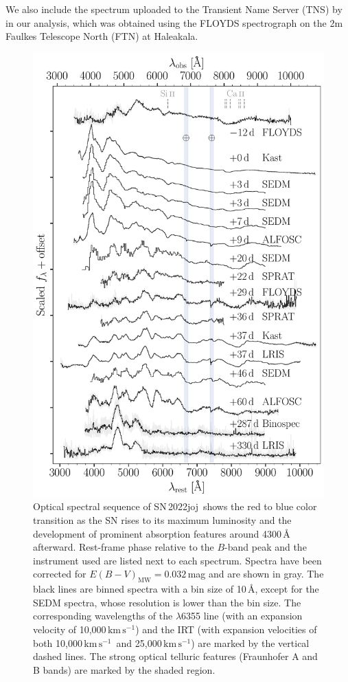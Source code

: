 \documentclass[twocolumn]{aastex631}
\newcommand{\sn}{SN\,2022joj}
\newcommand{\kms}{$\mathrm{km}\,\mathrm{s}^{-1}$}
\begin{document}
\begin{CJK*}{UTF8}{gbsn}
We also include the spectrum uploaded to the Transient Name Server (TNS) by \citet{Newsome_2022TNSCR} in our analysis, which was obtained using the FLOYDS spectrograph on the 2m Faulkes Telescope North (FTN) at Haleakala.

\begin{figure}
    \centering
    \includegraphics[width=\linewidth]{SN2022joj_spectral_sequence.pdf}
    \caption{Optical spectral sequence of \sn\ shows the red to blue color transition as the SN rises to its maximum luminosity and the development of prominent absorption features around 4300\,\r{A} afterward.
    Rest-frame phase relative to the $B$-band peak and the instrument used are listed next to each spectrum. Spectra have been corrected for ${E(B-V)_\mathrm{MW}} = 0.032$\,mag and are shown in gray. The black lines are binned spectra with a bin size of 10\,\AA, except for the SEDM spectra, whose resolution is lower than the bin size. The corresponding wavelengths of the  $\lambda$6355 line (with an expansion velocity of 10,000\,\kms) and the  IRT (with expansion velocities of both 10,000\,\kms\ and 25,000\,\kms) are marked by the vertical dashed lines. The strong optical telluric features (Fraunhofer A and B bands) are marked by the shaded region.}

\end{figure}
\end{CJK*}
\end{document}
